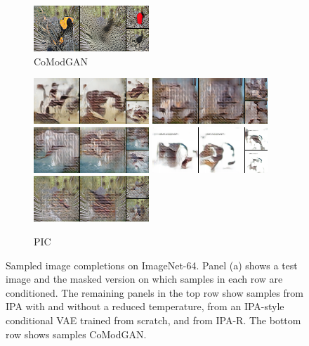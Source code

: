\begin{figure}[t]
\begin{subfigure}[t]{0.2\textwidth}
      \includegraphics[height=\imagenetimgheight]{figs/cigcvae/image-samples/imagenet64/freeform_co_mod_gan_4_samples.png}
      \caption{\scriptsize CoModGAN}
    \end{subfigure}
    \begin{subfigure}[t]{0.2\textwidth}
      \centering
      \includegraphics[height=\imagenetimgheight]{figs/cigcvae/image-samples/imagenet64/freeform_pic_0_samples.png}
      \includegraphics[height=\imagenetimgheight]{figs/cigcvae/image-samples/imagenet64/freeform_pic_1_samples.png}
      \includegraphics[height=\imagenetimgheight]{figs/cigcvae/image-samples/imagenet64/freeform_pic_2_samples.png}
      \includegraphics[height=\imagenetimgheight]{figs/cigcvae/image-samples/imagenet64/freeform_pic_3_samples.png}
      \includegraphics[height=\imagenetimgheight]{figs/cigcvae/image-samples/imagenet64/freeform_pic_4_samples.png}
      \caption{\scriptsize PIC}
    \end{subfigure}
    \begin{subfigure}[t]{0.4\textwidth}
      \setlength{\fboxrule}{0pt}
      \fbox{
        \begin{minipage}{5cm}
          \hfill\hspace{5cm}
        \end{minipage}
      }
    \end{subfigure}
    \caption{Sampled image completions on ImageNet-64. Panel (a) shows a test image
      and the masked version on which samples in each row are conditioned. The
      remaining panels in the top row show samples from IPA with and without a
      reduced temperature, from an IPA-style conditional VAE trained from
      scratch, and from IPA-R. The bottom row shows samples CoModGAN.}
    \vspace{-.5cm}
    \label{fig:cigcvae-imagenet-samples}
  \end{figure}


